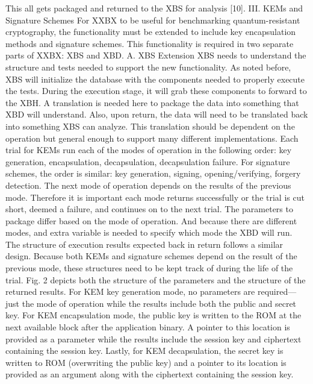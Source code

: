 This all gets packaged and returned to the XBS for analysis
[10].
III. KEMs and Signature Schemes
For XXBX to be useful for benchmarking quantum-resistant cryptography, the functionality must be extended to include key encapsulation methods and signature schemes. This functionality is required in two separate parts of XXBX: XBS and XBD.
A. XBS Extension
XBS needs to understand the structure and tests needed to support the new functionality. As noted before, XBS will initialize the database with the components needed to properly execute the tests. During the execution stage, it will grab these components to forward to the XBH. A translation is needed here to package the data into something that XBD will understand. Also, upon return, the data will need to be translated back into something XBS can analyze. This translation should be dependent on the operation but general enough to support many different implementations.
Each trial for KEMs run each of the modes of operation in the following order: key generation, encapsulation, decapsulation, decapsulation failure. For signature schemes, the order is similar: key generation, signing, opening/verifying, forgery detection. The next mode of operation depends on the results of the previous mode. Therefore it is important each mode returns successfully or the trial is cut short, deemed a failure, and continues on to the next trial.
The parameters to package differ based on the mode of operation. And because there are different modes, and extra variable is needed to specify which mode the XBD will run.
The structure of execution results expected back in return follows a similar design. Because both KEMs and signature schemes depend on the result of the previous mode, these structures need to be kept track of during the life of the trial. Fig. 2 depicts both the structure of the parameters and the structure of the returned results.
For KEM key generation mode, no parameters are required—just the mode of operation while the results include both the public and secret key. For KEM encapsulation mode, the public key is written to the ROM at the next available block after the application binary. A pointer to this location is provided as a parameter while the results include the session key and ciphertext containing the session key. Lastly, for KEM decapsulation, the secret key is written to ROM (overwriting the public key) and a pointer to its location is provided as an argument along with the ciphertext containing the session key.

